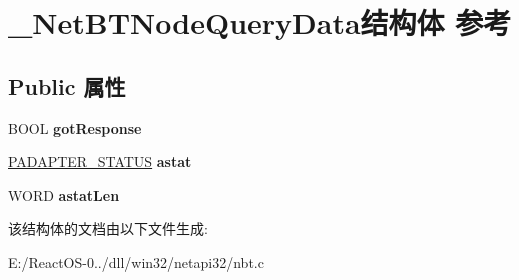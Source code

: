 \hypertarget{struct___net_b_t_node_query_data}{}\section{\+\_\+\+Net\+B\+T\+Node\+Query\+Data结构体 参考}
\label{struct___net_b_t_node_query_data}
\subsection*{Public 属性}
\begin{DoxyCompactItemize}
\item 
\mbox{\label{struct___net_b_t_node_query_data_ab8427117967b58d608cc573fc62f4c88}} 
B\+O\+OL {\bfseries got\+Response}
\item 
\mbox{\label{struct___net_b_t_node_query_data_a5088098a0d547a0bebdc82d5ee45256f}} 
\hyperlink{struct___a_d_a_p_t_e_r___s_t_a_t_u_s}{P\+A\+D\+A\+P\+T\+E\+R\+\_\+\+S\+T\+A\+T\+US} {\bfseries astat}
\item 
\mbox{\label{struct___net_b_t_node_query_data_aae26d035b5a93cb43372a926d51e6a9f}} 
W\+O\+RD {\bfseries astat\+Len}
\end{DoxyCompactItemize}


该结构体的文档由以下文件生成\+:\begin{DoxyCompactItemize}
\item 
E\+:/\+React\+O\+S-\/0../dll/win32/netapi32/nbt.\+c\end{DoxyCompactItemize}
